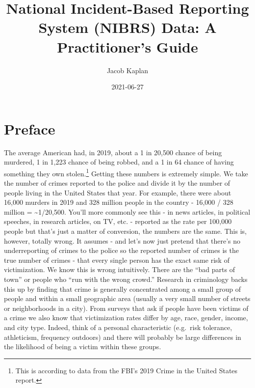 \documentclass[
  12pt,
  openany]{book}
\title{National Incident-Based Reporting System (NIBRS) Data: A Practitioner's Guide}
\author{Jacob Kaplan}
\date{2021-06-27}
\begin{document}
\maketitle

{
\hypersetup{linkcolor=}
\setcounter{tocdepth}{4}
\tableofcontents
}
\listoftables
\listoffigures
{}
\hypertarget{preface}{%
\chapter{Preface}\label{preface}}

The average American had, in 2019, about a 1 in 20,500 chance of being murdered, 1 in 1,223 chance of being robbed, and a 1 in 64 chance of having something they own stolen.\footnote{This is according to data from the FBI's 2019 Crime in the United States report.} Getting these numbers is extremely simple. We take the number of crimes reported to the police and divide it by the number of people living in the United States that year. For example, there were about 16,000 murders in 2019 and 328 million people in the country - 16,000 / 328 million = \textasciitilde1/20,500. You'll more commonly see this - in news articles, in political speeches, in research articles, on TV, etc. - reported as the rate per 100,000 people but that's just a matter of conversion, the numbers are the same. This is, however, totally wrong. It assumes - and let's now just pretend that there's no underreporting of crimes to the police so the reported number of crimes is the true number of crimes - that every single person has the exact same risk of victimization. We know this is wrong intuitively. There are the ``bad parts of town'' or people who ``run with the wrong crowd.'' Research in criminology backs this up by finding that crime is generally concentrated among a small group of people and within a small geographic area (usually a very small number of streets or neighborhoods in a city). From surveys that ask if people have been victims of a crime we also know that victimization rates differ by age, race, gender, income, and city type. Indeed, think of a personal characteristic (e.g.~risk tolerance, athleticism, frequency outdoors) and there will probably be large differences in the likelihood of being a victim within these groups.
\end{document}
